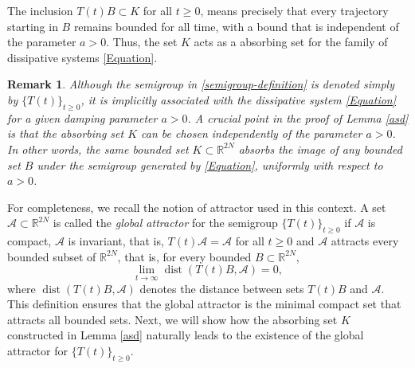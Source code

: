 \documentclass[12pt]{amsart}
\numberwithin{equation}{section}
\newtheorem{remark}[theorem]{Remark}
\begin{document}
The inclusion $T(t)B \subset K$ for all $t\ge 0$, means precisely that every trajectory starting in $B$ remains bounded for all time, with a bound that is independent of the parameter $a>0$. Thus, the set $K$ acts as a absorbing set for the family of dissipative systems \eqref{Equation}.

\begin{remark}
	Although the semigroup in \eqref{semigroup-definition} is denoted simply by $\{T(t)\}_{t\ge 0}$, it is implicitly associated with the dissipative system \eqref{Equation} for a given damping parameter $a>0$. A crucial point in the proof of Lemma \ref{asd} is that the absorbing set $K$ can be chosen independently of the parameter $a>0$. In other words, the same bounded set $K\subset\mathbb{R}^{2N}$ absorbs the image of any bounded set $B$ under the semigroup generated by \eqref{Equation}, uniformly with respect to $a>0$. 
\end{remark}

For completeness, we recall the notion of attractor used in this context. A set $\mathcal{A}\subset \mathbb{R}^{2N}$ is called the \emph{global attractor} for the semigroup $\{T(t)\}_{t\ge 0}$ if $\mathcal{A}$ is compact, $\mathcal{A}$ is invariant, that is, $T(t)\mathcal{A}=\mathcal{A}$ for all $t\ge 0$ and $\mathcal{A}$ attracts every bounded subset of $\mathbb{R}^{2N}$, that is, for every bounded $B\subset \mathbb{R}^{2N}$,
$$
\lim_{t\to\infty}\operatorname{dist}(T(t)B,\mathcal{A})=0,
$$
where $\operatorname{dist}(T(t)B,\mathcal{A})$ denotes the distance between sets $T(t)B$ and $\mathcal{A}$. This definition ensures that the global attractor is the minimal compact set that attracts all bounded sets. Next, we will show how the absorbing set $K$ constructed in Lemma \ref{asd} naturally leads to the existence of the global attractor for $\{T(t)\}_{t\ge 0}$.
\end{document}
